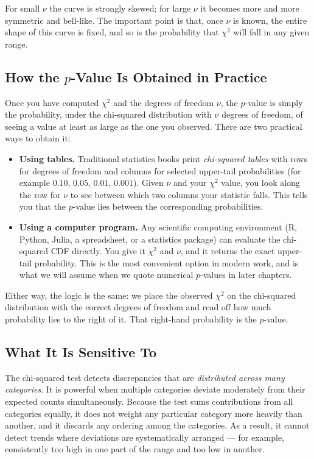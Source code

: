 For small $\nu$ the curve is strongly skewed; for large $\nu$ it becomes
more and more symmetric and bell-like.  The important point is that, once
$\nu$ is known, the entire shape of this curve is fixed, and so is the
probability that $\chi^2$ will fall in any given range.

\subsection{How the $p$-Value Is Obtained in Practice}

Once you have computed $\chi^2$ and the degrees of freedom $\nu$, the
$p$-value is simply the probability, under the chi-squared distribution
with $\nu$ degrees of freedom, of seeing a value at least as large as the
one you observed.  There are two practical ways to obtain it:
\begin{itemize}
  \item \textbf{Using tables.}  Traditional statistics books print
        \emph{chi-squared tables} with rows for degrees of freedom and
        columns for selected upper-tail probabilities (for example
        $0.10$, $0.05$, $0.01$, $0.001$).  Given $\nu$ and your $\chi^2$
        value, you look along the row for $\nu$ to see between which two
        columns your statistic falls.  This tells you that the $p$-value
        lies between the corresponding probabilities.
  \item \textbf{Using a computer program.}  Any scientific computing
        environment (R, Python, Julia, a spreadsheet, or a statistics
        package) can evaluate the chi-squared CDF directly.  You give it
        $\chi^2$ and $\nu$, and it returns the exact upper-tail
        probability.  This is the most convenient option in modern work,
        and is what we will assume when we quote numerical $p$-values in
        later chapters.
\end{itemize}

Either way, the logic is the same: we place the observed $\chi^2$ on the
chi-squared distribution with the correct degrees of freedom and read off
how much probability lies to the right of it.  That right-hand probability
is the $p$-value.
 
\subsection{What It Is Sensitive To}
 
The chi-squared test detects discrepancies that are \emph{distributed across
many categories}.  It is powerful when multiple categories deviate
moderately from their expected counts simultaneously.  Because the test
sums contributions from all categories equally, it does not weight any
particular category more heavily than another, and it discards any ordering
among the categories.  As a result, it cannot detect trends where deviations
are systematically arranged --- for example, consistently too high in one
part of the range and too low in another.
 
